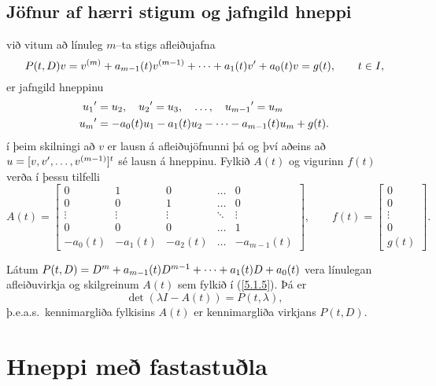 \subsection*{Jöfnur af hærri stigum  og jafngild hneppi}

við vitum að línuleg $m$--ta stigs afleiðujafna
 \begin{equation*}
P(t,D)v= v\sp{(m)}+a_{m-1}(t)v\sp{(m-1)}+\cdots+a_1(t)v{\sp{\prime}}
+a_0(t)v=g(t), \qquad t\in I, \label{5.1.3}
\end{equation*} 
er jafngild hneppinu
\begin{align*}
u_1{\sp{\prime}} &= u_2,\quad
u_2{\sp{\prime}} = u_3,\quad
\dots, \quad u_{m-1}{\sp{\prime}} = u_m\label{5.1.4}\\
u_m{\sp{\prime}} &=-a_0(t)u_1-a_1(t)u_2-\cdots-a_{m-1}(t)u_m+g(t).\nonumber
\end{align*}
í þeim skilningi að $v$ er lausn á afleiðujöfnunni þá og því aðeins að
$u=[v,v{\sp{\prime}},\dots,v^{(m-1)}]^t$ sé lausn á hneppinu.
Fylkið $A(t)$ og vigurinn $f(t)$ verða í þessu tilfelli 
\begin{equation*}A(t)=\left[\begin{matrix}
0&1&0&\dots&0\\
0&0&1&\dots&0\\
\vdots&\vdots&\vdots&\ddots&\vdots\\
0&0&0&\dots&1\\
-a_0(t)&-a_1(t)&-a_2(t)&\dots&-a_{m-1}(t)
\end{matrix}\right],
\qquad
f(t)=\left[\begin{matrix}
0\\
0\\
\vdots\\
0\\
g(t)
\end{matrix}\right].\label{5.1.5}
\end{equation*}

\begin{se} Látum  $P(t,D)=D\sp m+a_{m-1}(t)D\sp{m-1}+\cdots+a_1(t)D+a_0(t)$
vera línulegan afleiðuvirkja og skilgreinum $A(t)$ sem fylkið í
(\ref{5.1.5}).  Þá er
$$\det(\lambda I-A(t))=P(t,\lambda),$$
þ.e.a.s.~kennimargliða
fylkisins $A(t)$ er kennimargliða
virkjans $P(t,D)$.
\end{se}



\section{Hneppi með fastastuðla}

